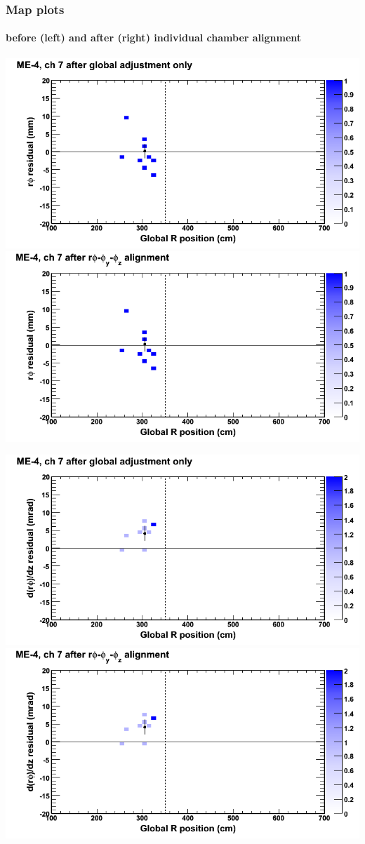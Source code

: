 \documentclass[compress]{beamer}
\begin{document}
\begin{frame}
\frametitle{Map plots}
\framesubtitle{before (left) and after (right) individual chamber alignment}
\includegraphics[width=0.5\linewidth]{ringmapplots_3dof/before_CSCvsr_mem4ch07_x.png} \includegraphics[width=0.5\linewidth]{ringmapplots_3dof/after_CSCvsr_mem4ch07_x.png}

\includegraphics[width=0.5\linewidth]{ringmapplots_3dof/before_CSCvsr_mem4ch07_dxdz.png} \includegraphics[width=0.5\linewidth]{ringmapplots_3dof/after_CSCvsr_mem4ch07_dxdz.png}
\end{frame}
\end{document}
